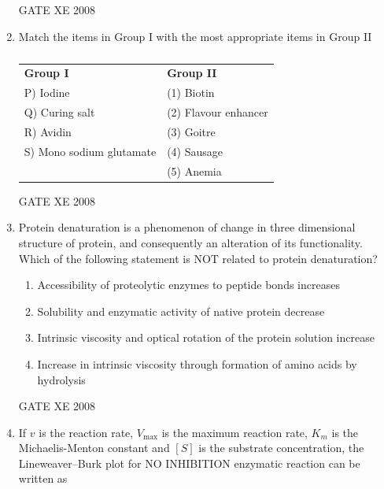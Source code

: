 \documentclass[12pt]{article}
\begin{document}
\begin{enumerate}
GATE XE 2008

\item Match the items in Group I with the most appropriate items in Group II  

\begin{table}[H]     \centering     \caption{}     \label{}     \begin{tabular}{l l}
\textbf{Group I} & \textbf{Group II} \\
P) Iodine & (1) Biotin \\
Q) Curing salt & (2) Flavour enhancer \\
R) Avidin & (3) Goitre \\
S) Mono sodium glutamate & (4) Sausage \\
 & (5) Anemia \\
\end{tabular} \end{table}  

\begin{enumerate}
\end{enumerate}

GATE XE 2008

\item  Protein denaturation is a phenomenon of change in three dimensional structure of protein, and consequently an alteration of its functionality. Which of the following statement is NOT related to protein denaturation?  

\begin{enumerate}
\item  Accessibility of proteolytic enzymes to peptide bonds increases 
\item  Solubility and enzymatic activity of native protein decrease  
\item  Intrinsic viscosity and optical rotation of the protein solution increase  
\item  Increase in intrinsic viscosity through formation of amino acids by hydrolysis 
\end{enumerate}

GATE XE 2008

\item If $v$ is the reaction rate, $V_{\max}$ is the maximum reaction rate, $K_m$ is the Michaelis-Menton constant and $[S]$ is the substrate concentration, the Lineweaver–Burk plot for NO INHIBITION enzymatic reaction can be written as  


\end{enumerate}
\end{document}
